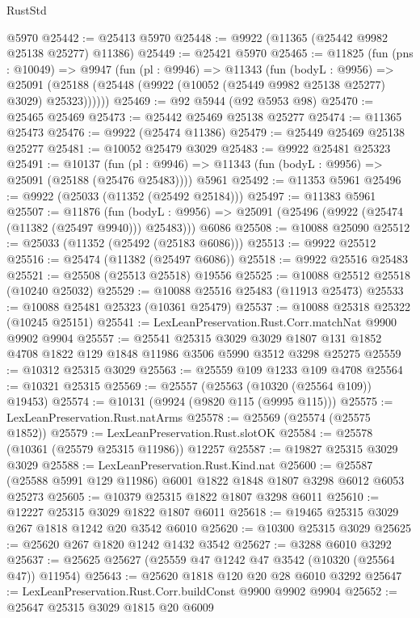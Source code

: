\begin{lexlean}{RustStd}
\begin{coremodule}
    @5970
@25442 := @25413 @5970
@25448 := @9922 (@11365 (@25442 @9982 @25138 @25277) @11386)
@25449 := @25421 @5970
@25465 := @11825
    (fun (pns : @10049) =>
    @9947
      (fun (pl : @9946) =>
      @11343
        (fun (bodyL : @9956) =>
        @25091 (@25188 (@25448 (@9922 (@10052 (@25449 @9982 @25138 @25277) @3029) @25323))))))
@25469 := @92 @5944 (@92 @5953 @98)
@25470 := @25465 @25469
@25473 := @25442 @25469 @25138 @25277
@25474 := @11365 @25473
@25476 := @9922 (@25474 @11386)
@25479 := @25449 @25469 @25138 @25277
@25481 := @10052 @25479 @3029
@25483 := @9922 @25481 @25323
@25491 := @10137
    (fun (pl : @9946) => @11343 (fun (bodyL : @9956) => @25091 (@25188 (@25476 @25483))))
    @5961
@25492 := @11353 @5961
@25496 := @9922 (@25033 (@11352 (@25492 @25184)))
@25497 := @11383 @5961
@25507 := @11876
    (fun (bodyL : @9956) => @25091 (@25496 (@9922 (@25474 (@11382 (@25497 @9940))) @25483)))
    @6086
@25508 := @10088 @25090
@25512 := @25033 (@11352 (@25492 (@25183 @6086)))
@25513 := @9922 @25512
@25516 := @25474 (@11382 (@25497 @6086))
@25518 := @9922 @25516 @25483
@25521 := @25508 (@25513 @25518) @19556
@25525 := @10088 @25512 @25518 (@10240 @25032)
@25529 := @10088 @25516 @25483 (@11913 @25473)
@25533 := @10088 @25481 @25323 (@10361 @25479)
@25537 := @10088 @25318 @25322 (@10245 @25151)
@25541 := LexLeanPreservation.Rust.Corr.matchNat @9900 @9902 @9904
@25557 := @25541
    @25315
    @3029
    @3029
    @1807
    @131
    @1852
    @4708
    @1822
    @129
    @1848
    @11986
    @3506
    @5990
    @3512
    @3298
    @25275
@25559 := @10312 @25315 @3029
@25563 := @25559 @109 @1233 @109 @4708
@25564 := @10321 @25315
@25569 := @25557 (@25563 (@10320 (@25564 @109)) @19453)
@25574 := @10131 (@9924 (@9820 @115 (@9995 @115)))
@25575 := LexLeanPreservation.Rust.natArms
@25578 := @25569 (@25574 (@25575 @1852))
@25579 := LexLeanPreservation.Rust.slotOK
@25584 := @25578 (@10361 (@25579 @25315 @11986)) @12257
@25587 := @19827 @25315 @3029 @3029
@25588 := LexLeanPreservation.Rust.Kind.nat
@25600 := @25587 (@25588 @5991 @129 @11986) @6001 @1822 @1848 @1807 @3298 @6012 @6053 @25273
@25605 := @10379 @25315 @1822 @1807 @3298 @6011
@25610 := @12227 @25315 @3029 @1822 @1807 @6011
@25618 := @19465 @25315 @3029 @267 @1818 @1242 @20 @3542 @6010
@25620 := @10300 @25315 @3029
@25625 := @25620 @267 @1820 @1242 @1432 @3542
@25627 := @3288 @6010 @3292
@25637 := @25625 @25627 (@25559 @47 @1242 @47 @3542 (@10320 (@25564 @47)) @11954)
@25643 := @25620 @1818 @120 @20 @28 @6010 @3292
@25647 := LexLeanPreservation.Rust.Corr.buildConst @9900 @9902 @9904
@25652 := @25647 @25315 @3029 @1815 @20 @6009

\end{coremodule}
\end{lexlean}
